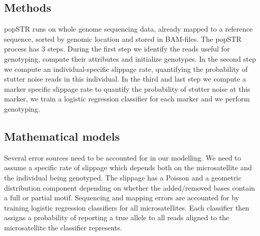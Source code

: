 \documentclass{bioinfo}
\begin{document}
\begin{methods}
\section{Methods}
popSTR runs on whole genome sequencing data, already mapped to a reference sequence, sorted by genomic location and stored in BAM-files.
The popSTR process has 3 steps. During the first step we identify the reads useful for genotyping, compute their attributes and initialize genotypes. In the second step we compute an individual-specific slippage rate, quantifying the probability of stutter noise reads in this individual. In the third and last step we compute a marker specific slippage rate to quantify the probability of stutter noise at this marker, we train a logistic regression classifier for each marker and we perform genotyping.
\enlargethispage{6pt}
\subsection{Mathematical models}
Several error sources need to be accounted for in our modelling. We need to assume a specific rate of slippage which depends both on the microsatellite and the individual being genotyped. The slippage has a Poisson and a geometric distribution component depending on whether the added/removed bases contain a full or partial motif. Sequencing and mapping errors are accounted for by training logistic regression classifiers for all microsatellites. Each classifier then assigns a probability of reporting a true allele to all reads aligned to the microsatellite the classifier represents. 

\end{methods}
\end{document}
